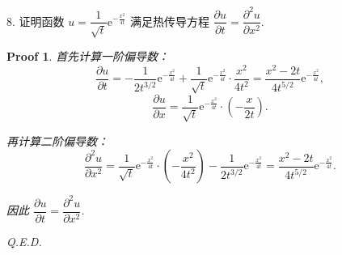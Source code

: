 \documentclass[a4paper,12pt]{article}
\newtheorem*{pf}{Proof}
\begin{document}
8. 证明函数 $u = \dfrac{1}{\sqrt{t}} \mathrm{e}^{-\frac{x^2}{4t}}$ 满足热传导方程 $\dfrac{\partial u}{\partial t} = \dfrac{\partial^2 u}{\partial x^2}$.
\begin{pf}
    首先计算一阶偏导数：
    $$\frac{\partial u}{\partial t}=-\frac{1}{2t^{3/2}}\mathrm{e}^{-\frac{x^2}{4t}}+\frac{1}{\sqrt{t}}\mathrm{e}^{-\frac{x^2}{4t}}\cdot\frac{x^2}{4t^2}=\frac{x^2-2t}{4t^{5/2}}\mathrm{e}^{-\frac{x^2}{4t}},$$
    $$\frac{\partial u}{\partial x}=\frac{1}{\sqrt{t}} \mathrm{e}^{-\frac{x^2}{4t}}\cdot\left(-\frac{x}{2t}\right).$$
    
    再计算二阶偏导数：
    $$\frac{\partial^2 u}{\partial x^2}=\frac{1}{\sqrt{t}} \mathrm{e}^{-\frac{x^2}{4t}}\cdot\left(-\frac{x^2}{4t^2}\right)-\frac{1}{2t^{3/2}} \mathrm{e}^{-\frac{x^2}{4t}}=\frac{x^2-2t}{4t^{5/2}}\mathrm{e}^{-\frac{x^2}{4t}}.$$
    
    因此 $\dfrac{\partial u}{\partial t} = \dfrac{\partial^2 u}{\partial x^2}$.
    
    Q.E.D.
\end{pf}
\end{document}
